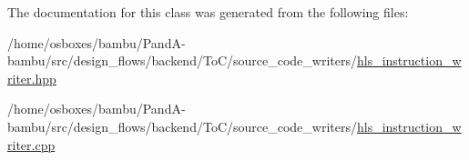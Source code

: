 The documentation for this class was generated from the following files\+:\begin{DoxyCompactItemize}
\item 
/home/osboxes/bambu/\+Pand\+A-\/bambu/src/design\+\_\+flows/backend/\+To\+C/source\+\_\+code\+\_\+writers/\hyperlink{hls__instruction__writer_8hpp}{hls\+\_\+instruction\+\_\+writer.\+hpp}\item 
/home/osboxes/bambu/\+Pand\+A-\/bambu/src/design\+\_\+flows/backend/\+To\+C/source\+\_\+code\+\_\+writers/\hyperlink{hls__instruction__writer_8cpp}{hls\+\_\+instruction\+\_\+writer.\+cpp}\end{DoxyCompactItemize}
